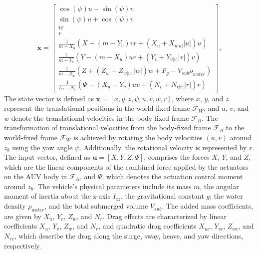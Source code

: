 \begin{equation}
    \label{eq:rov_simplified}
    \begin{aligned}
        \dot{\mathbf{x}} = \begin{bmatrix}
        \cos(\psi)u-\sin(\psi)v \\ 
        \sin(\psi)u+\cos(\psi)v \\ 
        w \\ 
        r \\ 
        \frac{1}{m-X_{\dot{u}}}\left(X + (m-Y_{\dot{v}})vr+(X_u+X_{u|u|}|u|)u\right) \\ 
        \frac{1}{m-Y_{\dot{v}}}\left(Y - (m-X_{\dot{u}})ur+(Y_v+Y_{v|v|}|v|)v\right) \\ 
        \frac{1}{m-Z_{\dot{w}}}\left(Z + (Z_w+Z_{w|w|}|w|)w+F_g-V_{sub } \rho_{water}\right) \\ 
        \frac{1}{I_{zz}-N_{\dot{r}}}\left(\Psi - (X_{\dot{u}}-Y_{\dot{v}})uv+(N_r+N_{r|r|}|r|)r\right) 
    \end{bmatrix},
    \end{aligned}
\end{equation}
The state vector is defined as $\mathbf{x} = [x, y, z, \psi, u, v, w, r]$, where $x$, $y$, and $z$ represent the translational positions in the world-fixed frame $\mathcal{F}_W$, and $u$, $v$, and $w$ denote the translational velocities in the body-fixed frame $\mathcal{F}_B$. The transformation of translational velocities from the body-fixed frame $\mathcal{F}_B$ to the world-fixed frame $\mathcal{F}_W$ is achieved by rotating the body velocities $(u, v)$ around $z_b$ using the yaw angle $\psi$. Additionally, the rotational velocity is represented by $r$. The input vector, defined as $\mathbf{u} = [X, Y, Z, \Psi]$, comprises the forces $X$, $Y$, and $Z$, which are the linear components of the combined force applied by the actuators on the AUV body in $\mathcal{F}_B$, and $\Psi$, which denotes the actuation control moment around $z_b$. 
The vehicle’s physical parameters include its mass $m$, the angular moment of inertia about the z-axis $I_{zz}$, the gravitational constant $g$, the water density $\rho_{water}$, and the total submerged volume $V_{sub}$. The added mass coefficients, are given by $X_{\dot{u}}$, $Y_{\dot{v}}$, $Z_{\dot{w}}$, and $N_{\dot{r}}$. Drag effects are characterized by linear coefficients $X_{u}$, $Y_{v}$, $Z_{w}$, and $N_{r}$, and quadratic drag coefficients $X_{uc}$, $Y_{vc}$, $Z_{wc}$, and $N_{rc}$, which describe the drag along the surge, sway, heave, and yaw directions, respectively.


